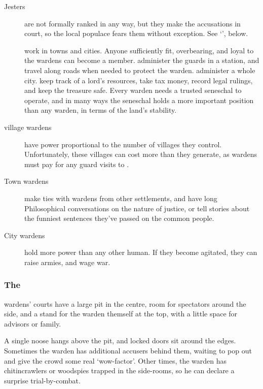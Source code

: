 \begin{multicols}{2}
\begin{description}
  \item[Jesters]
  are not formally ranked in any way, but they make the accusations in court, so the local populace fears them without exception.
  See `', below.
  \item[]
  work in towns and cities.
  Anyone sufficiently fit, overbearing, and loyal to the \glspl{warden} can become a member.
  administer the guards in a station, and travel along roads when needed to protect the \gls{warden}.
  administer a whole city.
  keep track of a lord's resources, take tax money, record legal rulings, and keep the treasure safe.
  Every \gls{warden} needs a trusted seneschal to operate, and in many ways the seneschal holds a more important position than any \gls{warden}, in terms of the land's stability.
  \item[\Gls{village} \Glspl{warden}]
  have power proportional to the number of \glspl{village} they control.
  Unfortunately, these \glspl{village} can cost more than they generate, as \glspl{warden} must pay for any \gls{guard} visits to .
  \item[Town \Glspl{warden}]
  make ties with \glspl{warden} from other settlements, and have long Philosophical conversations on the nature of justice, or tell stories about the funniest sentences they've passed on the common people.
  \item[City \Glspl{warden}]
  hold more power than any other human.
  If they become agitated, they can raise armies, and wage war.
\end{description}


\subsubsection{The }
\label{pitOfJustice}

\Glspl{warden}' courts have a large pit in the centre, room for spectators around the side, and a stand for the \gls{warden} themself at the top, with a little space for advisors or family.

A single noose hangs above the pit, and locked doors sit around the edges.
Sometimes the \gls{warden} has additional accusers behind them, waiting to pop out and give the crowd some real `wow-factor'.
Other times, the \gls{warden} has chitincrawlers or woodspies trapped in the side-rooms, so he can declare a surprise trial-by-combat.


\end{multicols}
